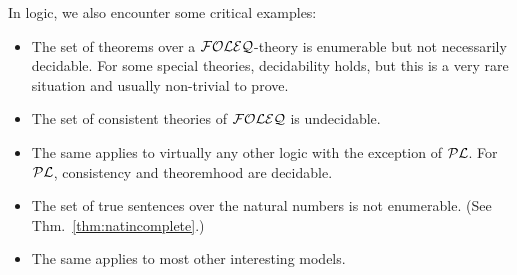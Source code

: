 In logic, we also encounter some critical examples:
\begin{itemize}
\item The set of theorems over a ${\mathcal{FOLEQ}}$-theory is enumerable but not necessarily decidable.
For some special theories, decidability holds, but this is a very rare situation and usually non-trivial to prove.\\
\item The set of consistent theories of ${\mathcal{FOLEQ}}$ is undecidable.
\item The same applies to virtually any other logic with the exception of ${\mathcal{PL}}$.
For ${\mathcal{PL}}$, consistency and theoremhood are decidable.
\item The set of true sentences over the natural numbers is not enumerable. (See Thm.~\ref{thm:natincomplete}.)
\item The same applies to most other interesting models.
\end{itemize}
